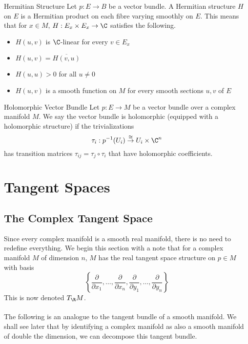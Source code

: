 \documentclass[a4paper]{article}
\begin{document}
\begin{defn}{Hermitian Structure}{} Let $p:E\to B$ be a vector bundle. A Hermitian structure $H$ on $E$ is a Hermitian product on each fibre varying smoothly on $E$. This means that for $x\in M$, $H:E_x\times E_x\to\C$ satisfies the following.
\begin{itemize}
\item $H(u,v)$ is $\C$-linear for every $v\in E_x$
\item $H(u,v)=\overline{H(v,u)}$
\item $H(u,u)>0$ for all $u\neq 0$
\item $H(u,v)$ is a smooth function on $M$ for every smooth sections $u,v$ of $E$
\end{itemize}
\end{defn}

\begin{defn}{Holomorphic Vector Bundle}{} Let $p:E\to M$ be a vector bundle over a complex manifold $M$. We say the vector bundle is holomorphic (equipped with a holomorphic structure) if the trivializations $$\tau_i:p^{-1}(U_i)\overset{\cong}{\to}U_i\times\C^n$$ has transition matrices $\tau_{ij}=\tau_j\circ\tau_i$ that have holomorphic coefficients. 
\end{defn}

\pagebreak
\section{Tangent Spaces}
\subsection{The Complex Tangent Space}
Since every complex manifold is a smooth real manifold, there is no need to redefine everything. We begin this section with a note that for a complex manifold $M$ of dimension $n$, $M$ has the real tangent space structure on $p\in M$ with basis $$\left\{\frac{\partial}{\partial x_1},\dots,\frac{\partial}{\partial x_n},\frac{\partial}{\partial y_1},\dots,\frac{\partial}{\partial y_n}\right\}$$ This is now denoted $T_{\R}M$. \\~\\

The following is an analogue to the tangent bundle of a smooth manifold. We shall see later that by identifying a complex manifold as also a smooth manifold of double the dimension, we can decompose this tangent bundle. 
\end{document}
